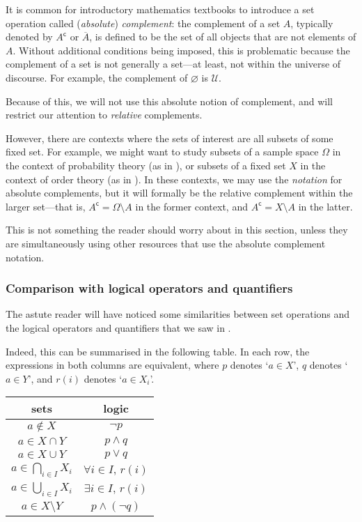 \begin{aside}
It is common for introductory mathematics textbooks to introduce a set operation called (\textit{absolute}) \textit{complement}: the complement of a set $A$, typically denoted by $A^{\mathsf{c}}$ or $\overline{A}$, is defined to be the set of all objects that are not elements of $A$. Without additional conditions being imposed, this is problematic because the complement of a set is not generally a set---at least, not within the universe of discourse. For example, the complement of $\varnothing$ is $\mathcal{U}$.

Because of this, we will not use this absolute notion of complement, and will restrict our attention to \textit{relative} complements.

However, there are contexts where the sets of interest are all subsets of some fixed set. For example, we might want to study subsets of a sample space $\Omega$ in the context of probability theory (as in ), or subsets of a fixed set $X$ in the context of order theory (as in ). In these contexts, we may use the \textit{notation} for absolute complements, but it will formally be the relative complement within the larger set---that is, $A^{\mathsf{c}} = \Omega \setminus A$ in the former context, and $A^{\mathsf{c}} = X \setminus A$ in the latter.

This is not something the reader should worry about in this section, unless they are simultaneously using other resources that use the absolute complement notation.
\end{aside}

\subsubsection*{Comparison with logical operators and quantifiers}

The astute reader will have noticed some similarities between set operations and the logical operators and quantifiers that we saw in .

Indeed, this can be summarised in the following table. In each row, the expressions in both columns are equivalent, where $p$ denotes `$a \in X$', $q$ denotes `$a \in Y$', and $r(i)$ denotes `$a \in X_i$'.

\begin{center}\begin{tabular}{c|c}
sets & logic \\ \hline
$a \not\in X$ & $\neg p$ \\
$a \in X \cap Y$ & $p \wedge q$ \\
$a \in X \cup Y$ & $p \vee q$ \\
$a \in \bigcap_{i \in I} X_i$ & $\forall i \in I,\, r(i)$ \\
$a \in \bigcup_{i \in I} X_i$ & $\exists i \in I,\, r(i)$ \\
$a \in X \setminus Y$ & $p \wedge (\neg q)$
\end{tabular}\end{center}

